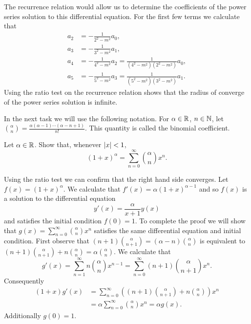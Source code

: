 \begin{solution}
\[    \]
    The recurrence relation would allow us to determine the coefficients of the power series solution to this differential equation.
    For the first few terms we calculate that
    \[
        \begin{aligned}
            a_2 & =  - \frac{1}{2^2 - m^2}a_{0},                                          \\
            a_3 & =  - \frac{1}{3^2 - m^2}a_{1},                                          \\
            a_4 & =  - \frac{1}{4^2 - m^2}a_{2} = \frac{1}{(4^2 - m^2)(2^2 - m^2)} a_{0}, \\
            a_5 & =  - \frac{1}{5^2 - m^2}a_{3} = \frac{1}{(5^2 - m^2)(3^2 - m^2)}a_{1}.
        \end{aligned}
    \]
    Using the ratio test on the recurrence relation shows that the radius of converge of the power series solution is infinite.
\end{solution}


In the next task we will use the following notation.
For \(\alpha \in \mathbb{R}\), \(n\in \mathbb{N}\), let
\(  \binom{\alpha}{n}= \frac{\alpha (\alpha-1) \cdots (\alpha-n+1)}{n!}\).
This quantity is called the binomial coefficient.

\begin{task}
    Let \(\alpha \in \mathbb{R}\).
    Show that, whenever \(\left|x\right|<1\),
    \[
        {(1+x)}^\alpha = \displaystyle\sum_{n=0}^{\infty} \textstyle\binom{\alpha}{n} x^n.
    \]
\end{task}

\begin{solution}
    Using the ratio test we can confirm that the right hand side converges.
    Let \(f(x) = {(1+x)}^\alpha\).
    We calculate that \(f'(x) = \alpha {(1+x)}^{\alpha-1}\) and so \(f(x)\) is a solution to the differential equation
    \[
        y'(x) = \frac{\alpha}{x+1}y(x)
    \]
    and satisfies the initial condition \(f(0)=1\).
    To complete the proof we will show that
    \(g(x) = \sum_{n=0}^{\infty} \binom{\alpha}{n} x^n\) satisfies the same differential equation and initial condition.
    First observe that
    \( (n+1)\binom{\alpha}{n+1} = (\alpha - n)\binom{\alpha}{n} \)
    is equivalent to
    \( (n+1)\binom{\alpha}{n+1} + n \binom{\alpha}{n} = \alpha \binom{\alpha}{n}\).
    We calculate that
    \[
        g'(x)
        =  \sum_{n=1}^{\infty} n \binom{\alpha}{n} x^{n-1}
        =  \sum_{n=0}^{\infty} (n+1) \binom{\alpha}{n+1} x^n.
    \]
    Consequently
    \[
        \begin{aligned}
            (1+x)g'(x)
             & = \sum_{n=0}^{\infty} \left( (n+1)\binom{\alpha}{n+1} + n\binom{\alpha}{n}    \right)  x^n \\
             & = \alpha  \sum_{n=0}^{\infty} \binom{\alpha}{n}  x^n = \alpha g(x).
        \end{aligned}
    \]
    Additionally \(g(0) = 1\).
\end{solution}


